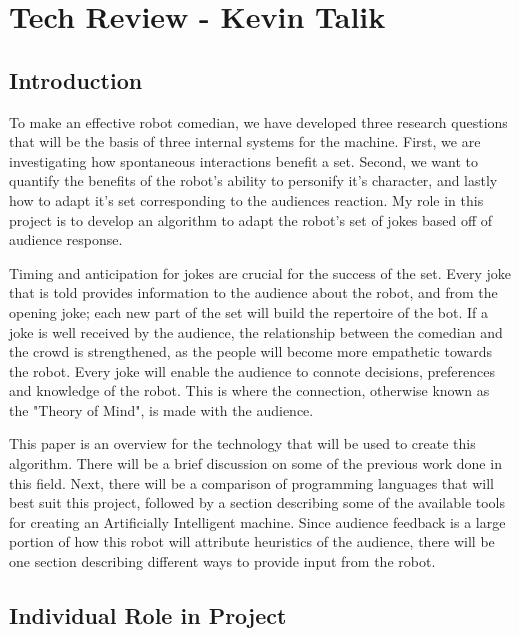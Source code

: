 
\section{Tech Review - Kevin Talik}
\subsection{Introduction}

  To make an effective robot comedian, we have developed three research questions that will be the basis of three internal systems for the machine. First, we are investigating how spontaneous interactions benefit a set. Second, we want to quantify the benefits of the robot's ability to personify it's character, and lastly how to adapt it's set corresponding to the audiences reaction. My role in this project is to develop an algorithm to adapt the robot's set of jokes based off of audience response.

  Timing and anticipation for jokes are crucial for the success of the set. Every joke that is told provides information to the audience about the robot, and from the opening joke; each new part of the set will build the repertoire of the bot. If a joke is well received by the audience, the relationship between the comedian and the crowd is strengthened, as the people will become more empathetic towards the robot. Every joke will enable the audience to connote decisions, preferences and knowledge of the robot. This is where the connection, otherwise known as the "Theory of Mind", is made with the audience\cite{leslie}.

  This paper is an overview for the technology that will be used to create this algorithm. There will be a brief discussion on some of the previous work done in this field. Next, there will be a comparison of programming languages that will best suit this project, followed by a section describing some of the available tools for creating an Artificially Intelligent machine. Since audience feedback is a large portion of how this robot will attribute heuristics of the audience, there will be one section describing different ways to provide input from the robot.

\subsection{Individual Role in Project}

